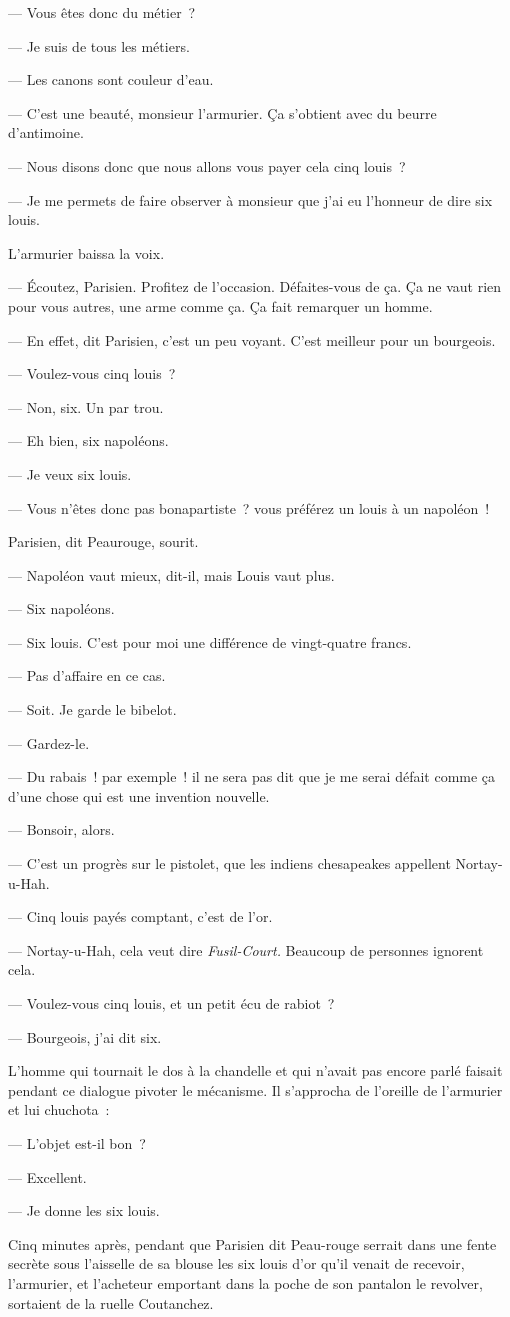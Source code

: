 \documentclass[french,twoside]{book} %
\begin{document}
— Vous êtes donc du métier ?\par
— Je suis de tous les métiers.\par
— Les canons sont couleur d’eau.\par
— C’est une beauté, monsieur l’armurier. Ça s’obtient avec du beurre d’antimoine.\par
— Nous disons donc que nous allons vous payer cela cinq louis ?\par
— Je me permets de faire observer à monsieur que j’ai eu l’honneur de dire six louis.\par
L’armurier baissa la voix.\par
— Écoutez, Parisien. Profitez de l’occasion. Défaites-vous de ça. Ça ne vaut rien pour vous autres, une arme comme ça. Ça fait remarquer un homme.\par
— En effet, dit Parisien, c’est un peu voyant. C’est meilleur pour un bourgeois.\par
— Voulez-vous cinq louis ?\par
— Non, six. Un par trou.\par
— Eh bien, six napoléons.\par
— Je veux six louis.\par
— Vous n’êtes donc pas bonapartiste ? vous préférez un louis à un napoléon !\par
Parisien, dit Peaurouge, sourit.\par
— Napoléon vaut mieux, dit-il, mais Louis vaut plus.\par
— Six napoléons.\par
— Six louis. C’est pour moi une différence de vingt-quatre francs.\par
 — Pas d’affaire en ce cas.\par
— Soit. Je garde le bibelot.\par
— Gardez-le.\par
— Du rabais ! par exemple ! il ne sera pas dit que je me serai défait comme ça d’une chose qui est une invention nouvelle.\par
— Bonsoir, alors.\par
— C’est un progrès sur le pistolet, que les indiens chesapeakes appellent Nortay-u-Hah.\par
— Cinq louis payés comptant, c’est de l’or.\par
— Nortay-u-Hah, cela veut dire \emph{Fusil-Court.} Beaucoup de personnes ignorent cela.\par
— Voulez-vous cinq louis, et un petit écu de rabiot ?\par
— Bourgeois, j’ai dit six.\par
L’homme qui tournait le dos à la chandelle et qui n’avait pas encore parlé faisait pendant ce dialogue pivoter le mécanisme. Il s’approcha de l’oreille de l’armurier et lui chuchota :\par
— L’objet est-il bon ?\par
— Excellent.\par
— Je donne les six louis.\par
Cinq minutes après, pendant que Parisien dit Peau-rouge serrait dans une fente secrète sous l’aisselle de sa blouse les six louis d’or qu’il venait de recevoir, l’armurier, et l’acheteur emportant dans la poche de son pantalon le revolver, sortaient de la ruelle Coutanchez.
\end{document}
